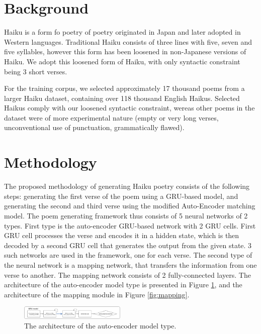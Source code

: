 \documentclass{acm_proc_article-sp}
\begin{document}
\section{Background}

Haiku is a form fo poetry of poetry originated in Japan and later adopted in Western languages. Traditional Haiku consists of three lines with five, seven and five syllables, however this form has been loosened in non-Japanese versions of Haiku. We adopt this loosened form of Haiku, with only syntactic constraint being 3 short verses.

For the training corpus, we selected approximately 17 thousand poems from a larger Haiku dataset, containing over 118 thousand English Haikus. Selected Haikus comply with our loosened syntactic constraint, wereas other poems in the dataset were of more experimental nature (empty or very long verses, unconventional use of punctuation, grammatically flawed).

\section{Methodology}

The proposed methodology of generating Haiku poetry consists of the following steps: generating the first verse of the poem using a GRU-based model, and generating the second and third verse using the modified Auto-Encoder matching model. The poem generating framework thus consists of 5 neural networks of 2 types. First type is the auto-encoder GRU-based network with 2 GRU cells. First GRU cell processes the verse and encodes it in a hidden state, which is then decoded by a second GRU cell that generates the output from the given state. 3 such networks are used in the framework, one for each verse. The second type of the neural network is a mapping network, that transfers the information from one verse to another. The mapping network consists of 2 fully-connected layers. The architecture of the auto-encoder model type is presented in Figure \ref{fig:autoenc}, and the architecture of the mapping module in Figure \ref{fig:mapping}.

\begin{figure}[h!]
	\centering
	\includegraphics[width=0.45\textwidth]{flowchart/autoenc.pdf}
    \caption[The architecture of the auto-encoder model type.]{The architecture of the auto-encoder model type.}
    \label{fig:autoenc}
\end{figure}
\end{document}
